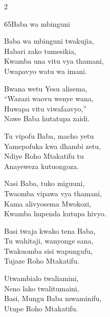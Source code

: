 \begin{multicols}{2}
\begin{hymn}{65}{Baba wa mbinguni}{}
\begin{stanza}
Baba wa mbinguni twakujia,\\
Habari zako tumesikia,\\
Kwamba una vitu vya thamani,\\
Uwapavyo watu wa imani.
\end{stanza}
\begin{stanza}
Bwana wetu Yesu alisema,\\
``Wazazi waovu wenye wana,\\
Huwapa vitu viwafaavyo,''\\
Nawe Baba hutatupa zaidi.
\end{stanza}
\begin{stanza}
Tu vipofu Baba, macho yetu\\
Yamepofuka kwa dhambi zetu,\\
Ndiye Roho Mtakatifu tu\\
Anayeweza kutuongoza.
\end{stanza}
\begin{stanza}
Nasi Baba, tuko miguuni,\\
Twaomba vipawa vya thamani,\\
Kama alivyosema Mwokozi,\\
Kwamba hupenda kutupa hivyo.
\end{stanza}
\begin{stanza}
Basi twaja kwako tena Baba,\\
Tu wahitaji, wanyonge sana,\\
Twakuomba sisi wapungufu,\\
Tujaze Roho Mtakatifu.
\end{stanza}
\begin{stanza}
Utwambialo twaliamini,\\
Neno lako twalitumaini,\\
Basi, Mungu Baba mwaminifu,\\
Utupe Roho Mtakatifu.
\end{stanza}
\end{hymn}


\end{multicols}
